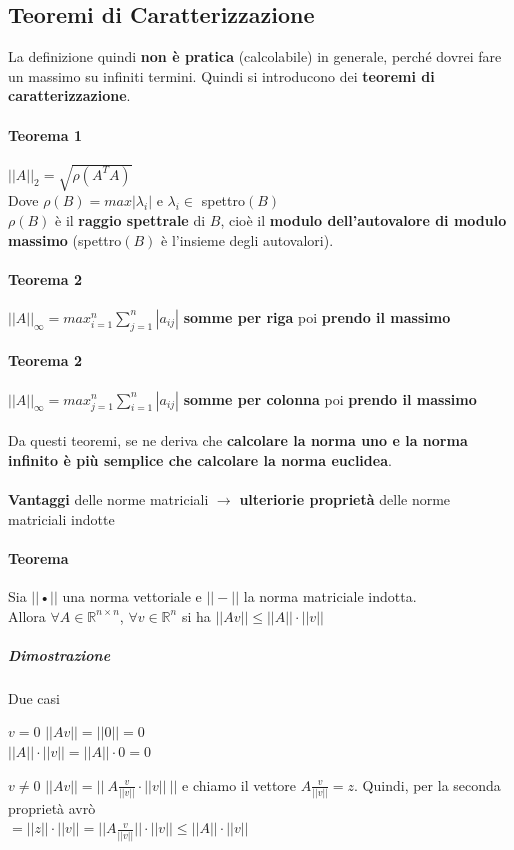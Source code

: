 \documentclass[10pt]{book}
\begin{document}
\subsection{Teoremi di Caratterizzazione}
La definizione quindi \textbf{non è pratica} (calcolabile) in generale, perché dovrei fare un massimo su infiniti termini. Quindi si introducono dei \textbf{teoremi di caratterizzazione}.
\paragraph{Teorema 1} $||A||_2 = \sqrt{\rho (A^TA)}$\\Dove $\rho(B) = max |\lambda_i|$ e $\lambda_i \in $ spettro$(B)$\\
$\rho(B)$ è il \textbf{raggio spettrale} di $B$, cioè il \textbf{modulo dell'autovalore di modulo massimo} (spettro$(B)$ è l'insieme degli autovalori).
\paragraph{Teorema 2} $||A||_\infty = max_{i = 1}^n \sum_{j = 1}^n |a_{ij}|$ \textbf{somme per riga} poi \textbf{prendo il massimo}
\paragraph{Teorema 2} $||A||_\infty = max_{j = 1}^n \sum_{i = 1}^n |a_{ij}|$ \textbf{somme per colonna} poi \textbf{prendo il massimo}\\\\
Da questi teoremi, se ne deriva che \textbf{calcolare la norma uno e la norma infinito è più semplice che calcolare la norma euclidea}.\\\\
\textbf{Vantaggi} delle norme matriciali $\rightarrow$ \textbf{ulteriorie proprietà} delle norme matriciali indotte
\pagebreak
\paragraph{Teorema} Sia $||$•$||$ una norma vettoriale e $||-||$ la norma matriciale indotta.\\
Allora $\forall A \in \mathbb{R}^{n \times n}$, $\forall v \in \mathbb{R}^n$ si ha $||Av|| \leq ||A||\cdot||v||$
\subparagraph{Dimostrazione} Due casi
\begin{list}{}{}
	\item[$v = 0$] $||Av|| = ||0|| = 0$\\
	$||A||\cdot||v|| = ||A||\cdot 0 = 0$
	\item[$v \neq 0$] $||Av|| = ||\:A\frac{v}{||v||}\cdot||v||\:||$ e chiamo il vettore $A\frac{v}{||v||} = z$. Quindi, per la seconda proprietà avrò\\
	$= ||z||\cdot||v|| = ||A\frac{v}{||v||}||\cdot||v|| \leq ||A||\cdot||v||$
\end{list}
\end{document}
